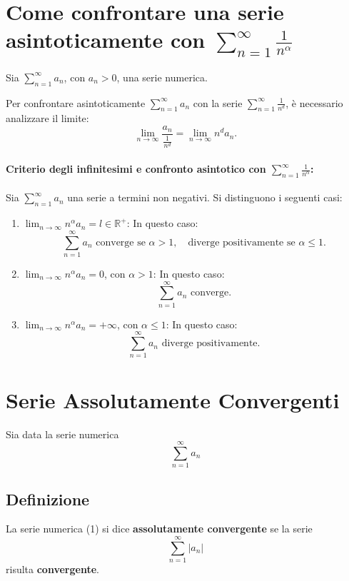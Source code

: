 \documentclass{article}
\begin{document}
\section*{Come confrontare una serie asintoticamente con \( \sum_{n=1}^{\infty} \frac{1}{n^{\alpha}} \)}

Sia \(\sum_{n=1}^\infty a_n\), con \(a_n > 0\), una serie numerica.

Per confrontare asintoticamente \(\sum_{n=1}^\infty a_n\) con la serie \(\sum_{n=1}^\infty \frac{1}{n^d}\), è necessario analizzare il limite:
\[
\lim_{n \to \infty} \frac{a_n}{\frac{1}{n^d}} = \lim_{n \to \infty} n^d a_n.
\]

\paragraph{Criterio degli infinitesimi e confronto asintotico con \(\sum_{n=1}^\infty \frac{1}{n^\alpha}\):}  
Sia \(\sum_{n=1}^\infty a_n\) una serie a termini non negativi. Si distinguono i seguenti casi:


\begin{enumerate}
    \item \(\lim_{n \to \infty} n^\alpha a_n = l \in \mathbb{R}^+\):  
    In questo caso:
    \[
    \sum_{n=1}^\infty a_n \text{ converge se } \alpha > 1, \quad \text{diverge positivamente se } \alpha \leq 1.
    \]

    \item \(\lim_{n \to \infty} n^\alpha a_n = 0\), con \(\alpha > 1\):  
    In questo caso:
    \[
    \sum_{n=1}^\infty a_n \text{ converge.}
    \]

    \item \(\lim_{n \to \infty} n^\alpha a_n = +\infty\), con \(\alpha \leq 1\):  
    In questo caso:
    \[
    \sum_{n=1}^\infty a_n \text{ diverge positivamente.}
    \]
\end{enumerate}

\section*{Serie Assolutamente Convergenti}
Sia data la serie numerica 
\[
    \sum_{n=1}^{\infty} a_n \tag{1}
\]
\subsection*{Definizione}
La serie numerica (1) si dice \textbf{assolutamente convergente} se la serie 
\[
    \sum_{n=1}^{\infty} |a_n|
\]
risulta \textbf{convergente}.
\end{document}
